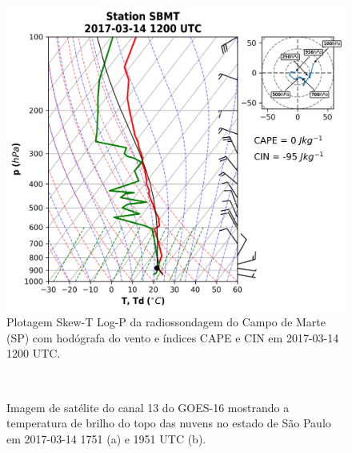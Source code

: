 \begin{figure}[hp]
	\begin{center}
		\caption{Plotagem Skew-T Log-P da radiossondagem do Campo de Marte (SP) com hodógrafa do vento e índices CAPE e CIN em 2017-03-14 1200 UTC.} 
		\label{sondagem_20170314}
		\includegraphics[width=0.75\columnwidth]{../Sounding_Processing/figures/sounding_SBMT2017031412UTC.png}
	\end{center}
\end{figure}

%
\begin{figure}[hp]
	\begin{center}
		\caption{Imagem de satélite do canal 13 do GOES-16 mostrando a temperatura de brilho do topo das nuvens no estado de São Paulo em 2017-03-14 1751 (a) e 1951 UTC (b).} 
		\label{goes16_sp_20170314}
		 \\
	\end{center}
\end{figure}

